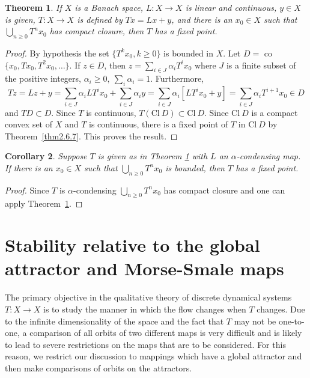 \documentclass{surv-l}
\theoremstyle{plain}
\newtheorem{theorem}{Theorem}[section]
\newtheorem{corollary}[theorem]{Corollary}
\theoremstyle{definition}
\numberwithin{equation}{section}
\numberwithin{figure}{chapter}
\begin{document}
\begin{theorem}\label{thm2.6.8} If $X$ is a Banach space, $L\!:X\rightarrow X$ is linear and continuous, $y\in X$ is given, $T\!:X\rightarrow X$ is defined by $Tx=Lx+y$, and there is an $x_{0}\in X$ such that $\bigcup_{n\geq 0}T^{n}x_{0}$ has compact closure, then $T$ has a fixed point.
\end{theorem}

\begin{proof} By hypothesis the set $\{T^{k}x_{0}, k\geq 0\}$ is bounded in $X$. Let $D=$ co$\{x_{0}, Tx_{0}, T^{2}x_{0},\ldots\}$. If $z\in D$, then $z=\sum_{i\in J}\alpha_{i}T^{i}x_{0}$ where $J$ is a finite subset of the positive integers, $\alpha_{i}\geq 0,\ \sum_{i}\alpha_{i}=1$. Furthermore,
\begin{equation*}
Tz=Lz+y=\sum_{i\in J}\alpha_{i}LT^{i}x_{0}+\sum_{i\in J}\alpha_{i}y=\sum_{i\in J}\alpha_{i}[LT^{i}x_{0}+y]=\sum_{i\in J}\alpha_{i}T^{i+1}x_{0}\in D
\end{equation*}
and $TD\subset D$. Since $T$ is continuous, $T(\mathrm{Cl}\ D)\subset \mathrm{Cl}\ D$. Since $\mathrm{Cl}\ D$ is a compact convex set of $X$ and $T$ is continuous, there is a fixed point of $T$ in $\mathrm{Cl}\ D$ by Theorem~\ref{thm2.6.7}. This proves the result.
\end{proof}

\begin{corollary}\label{cor2.6.9} Suppose $T$ is given as in Theorem \emph{\ref{thm2.6.8}} with $L$ an $\alpha$-condensing map. If there is an $x_{0}\in X$ such that $\bigcup_{n\geq 0}T^{n}x_{0}$ is bounded, then $T$ has a fixed point.
\end{corollary}

\begin{proof} Since $T$ is $\alpha$-condensing $\bigcup_{n\geq 0}T^{n}x_{0}$ has compact closure and one can apply Theorem~\ref{thm2.6.8}.
\end{proof}

\section{Stability relative to the global attractor and Morse-Smale maps}\label{sec2.7}

The primary objective in the qualitative theory of discrete dynamical systems $T\!:X\rightarrow X$ is to study the manner in which the flow changes when $T$ changes. Due to the infinite dimensionality of the space and the fact that $T$ may not be one-to-one, a comparison of all orbits of two different maps is very difficult and is likely to lead to severe restrictions on the maps that are to be considered. For this reason, we restrict our discussion to mappings which have a global attractor and then make comparisons of orbits on the attractors.
\end{document}
